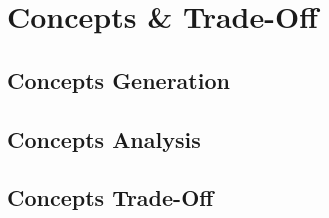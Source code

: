 \chapter{Concepts \& Trade-Off}
\setlength{\parindent}{15pt}
\label{ch:conc_trad}

\section{Concepts Generation}
\label{sec:conc_gene}

\section{Concepts Analysis}
\label{sec:conc_anal}

\section{Concepts Trade-Off}
\label{sec:conc_trad}
